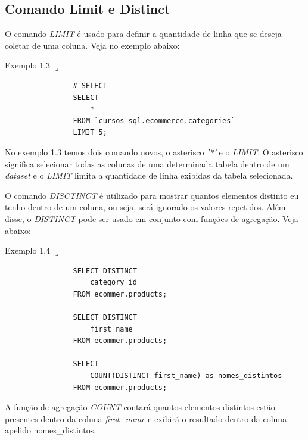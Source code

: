 \documentclass[a4paper]{article}
\begin{document}
        \subsection{Comando Limit e Distinct}
        
            O comando \textit{LIMIT} é usado para definir a quantidade de linha que se deseja coletar de uma coluna. Veja no exemplo abaixo:
            
            \bigskip
            
            Exemplo 1.3 \(\lrcorner\)
            
            \begin{verbatim}
                # SELECT
                SELECT
                    * 
                FROM `cursos-sql.ecommerce.categories`
                LIMIT 5;
            \end{verbatim}
            
            \bigskip
            
            No exemplo 1.3 temos dois comando novos, o asterisco \textit{'*'} e o \textit{LIMIT}. O asterisco significa selecionar todas as colunas de uma determinada tabela dentro de um \textit{dataset} e o \textit{LIMIT} limita a quantidade de linha exibidas da tabela selecionada.   
            
            O comando \textit{DISCTINCT} é utilizado para mostrar quantos elementos distinto eu tenho dentro de um coluna, ou seja, será ignorado os valores repetidos. Além disse, o \textit{DISTINCT} pode ser usado em conjunto com funções de agregação. Veja abaixo:
            
            \bigskip
            
            Exemplo 1.4 \(\lrcorner\)
            
            \begin{verbatim}
                SELECT DISTINCT
                    category_id
                FROM ecommer.products;
                
                SELECT DISTINCT
                    first_name
                FROM ecommer.products;
                
                SELECT
                    COUNT(DISTINCT first_name) as nomes_distintos
                FROM ecommer.products;
            \end{verbatim}
            
            \bigskip
            
            A função de agregação \textit{COUNT} contará quantos elementos distintos estão presentes dentro da coluna \textit{first\_name} e exibirá o resultado dentro da coluna apelido nomes\_distintos. 
            
\end{document}

